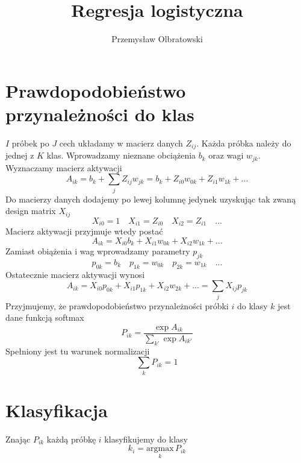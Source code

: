 \documentclass[10pt,a4paper]{article}
\title{Regresja logistyczna}
\author{Przemysław Olbratowski}
\begin{document}
\maketitle

\thispagestyle{empty}

\newpage

\section{Prawdopodobieństwo przynależności do klas}

$I$ próbek po $J$ cech układamy w macierz danych $Z_{ij}$. Każda próbka należy do jednej z $K$ klas. Wprowadzamy nieznane obciążenia $b_k$ oraz wagi $w_{jk}$. Wyznaczamy macierz aktywacji
\begin{displaymath}
A_{ik}=b_k+\sum_jZ_{ij}w_{jk}=b_k+Z_{i0}w_{0k}+Z_{i1}w_{1k}+...
\end{displaymath}
Do macierzy danych dodajemy po lewej kolumnę jedynek uzyskując tak zwaną design matrix $X_{ij}$
\begin{displaymath}
X_{i0}=1\quad X_{i1}=Z_{i0}\quad X_{i2}=Z_{i1}\quad...
\end{displaymath}
Macierz aktywacji przyjmuje wtedy postać
\begin{displaymath}
A_{ik}=X_{i0}b_k+X_{i1}w_{0k}+X_{i2}w_{1k}+...
\end{displaymath}
Zamiast obiążenia i wag wprowadzamy parametry $p_{jk}$
\begin{displaymath}
p_{0k}=b_k\quad p_{1k}=w_{0k}\quad p_{2k}=w_{1k}\quad...
\end{displaymath}
Ostatecznie macierz aktywacji wynosi
\begin{displaymath}
A_{ik}=X_{i0}p_{0k}+X_{i1}p_{1k}+X_{i2}w_{2k}+...=\sum_jX_{ij}p_{jk}
\end{displaymath}
Przyjmujemy, że prawdopodobieństwo przynależności próbki $i$ do klasy $k$ jest dane funkcją softmax
\begin{displaymath}
P_{ik}=\frac{\exp A_{ik}}{\sum_{k'}\exp A_{ik'}}
\end{displaymath}
Spełniony jest tu warunek normalizacji
\begin{displaymath}
\sum_kP_{ik}=1
\end{displaymath}

\section{Klasyfikacja}

Znając $P_{ik}$ każdą próbkę $i$ klasyfikujemy do klasy
\begin{displaymath}
k_i=\underset{k}{\mathrm{argmax}}\,P_{ik}
\end{displaymath}
\end{document}

